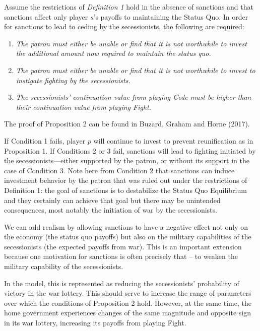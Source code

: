\begin{proposition}
Assume the restrictions of \emph{Definition 1} hold in the absence of sanctions and that sanctions affect only player $s$'s payoffs to maintaining the Status Quo.  In order for sanctions to lead to ceding by the secessionists, the following are required:

\begin{enumerate}
\item \textit{The patron must either be unable or find that it is not worthwhile to invest the additional amount now required to maintain the status quo.}

\item \textit{The patron must either be unable or find that it is not worthwhile to invest to instigate fighting by the secessionists.}

\item \textit{The secessionists' continuation value from playing Cede must be higher than their continuation value from playing Fight.}
\end{enumerate}

\end{proposition}

The proof of Proposition 2 can be found in Buzard, Graham and Horne (2017).

If Condition 1 fails, player $p$ will continue to invest to prevent reunification as in Proposition 1. If Conditions 2 or 3 fail, sanctions will lead to fighting initiated by the secessionists---either supported by the patron, or without its support in the case of Condition 3. Note here from Condition 2 that sanctions can induce investment behavior by the patron that was ruled out under the restrictions of Definition 1: the goal of sanctions is to destabilize the Status Quo Equilibrium and they certainly can achieve that goal but there may be unintended consequences, most notably the initiation of war by the secessionists. 

We can add realism by allowing sanctions to have a negative effect not only on the economy (the status quo payoffs) but also on the military capabilities of the secessionists (the expected payoffs from war). This is an important extension because one motivation for sanctions is often precisely that -- to weaken the military capability of the secessionists. 

In the model, this is represented as reducing the secessionists' probability of victory in the war lottery. This should serve to increase the range of parameters over which the conditions of Proposition 2 hold. However, at the same time, the home government experiences changes of the same magnitude and opposite sign in its war lottery, increasing its payoffs from playing Fight. 

